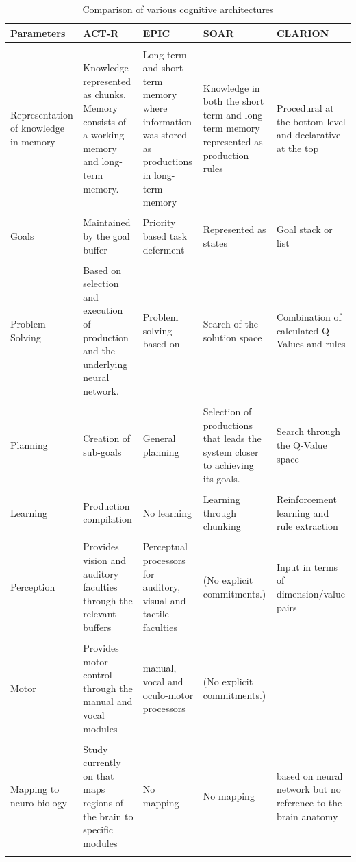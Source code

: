 \begin{landscape}
\begin{table}
  \centering
\caption{Comparison of various cognitive architectures}
\label{tab:architecture-comparison}
  \begin{tabular}{p{3cm}p{4cm}p{4cm}p{4cm}p{4cm}}
    \hline
    Parameters & ACT-R & EPIC & SOAR & CLARION \\
    \hline
    & & & &\\
    Representation of knowledge in memory & Knowledge represented as chunks. Memory consists of a
    working memory and long-term memory.& Long-term and short-term
    memory where information was stored as productions in long-term
    memory & Knowledge in both the short term and long term memory
    represented as production rules& Procedural at the bottom level and
    declarative at the top  \\
    & & & &\\
    Goals  & Maintained by the goal buffer & Priority based task
    deferment~\cite{Pew:1998aa}& Represented as states & Goal stack or list \\
    & & & &\\
    Problem Solving  & Based on selection and execution of production
    and the underlying neural network.& Problem solving based on &Search
    of the solution space& Combination of calculated Q-Values and rules\\
    & & & &\\
    Planning  & Creation of sub-goals&General planning & Selection of
    productions that leads the system closer to achieving its
    goals. &Search through the Q-Value space \\
    & & & &\\
    Learning   & Production compilation&No learning & Learning through
    chunking & Reinforcement learning and rule extraction \\
    & & & &\\
    Perception & Provides vision and auditory faculties through the
    relevant buffers& Perceptual processors for auditory, visual and
    tactile faculties & (No explicit commitments.) & Input in terms of dimension/value pairs\\
    & & & &\\
    Motor & Provides motor control through the manual and vocal modules&
    manual, vocal and oculo-motor processors
    & (No explicit commitments.) &\\
    & & & &\\
    Mapping to neuro-biology & Study currently on
    that maps regions of the brain to specific modules& No mapping& No
    mapping& based on neural network but no reference to the brain anatomy\cite{Chong:2007aa} \\
    & & & &\\

\end{tabular}
\end{table}
\end{landscape}

